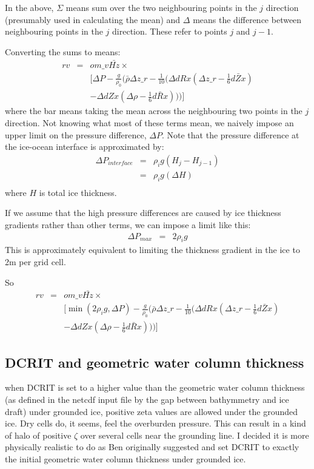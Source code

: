 \documentclass[12pt]{article}
\begin{document}
In the above, $\Sigma$ means sum over the two neighbouring points in the $j$ direction (presumably used in calculating the mean) 
and $\Delta$ means the difference between neighbouring points in the $j$ direction.  These refer to points $j$ and $j-1$.

Converting the sums to means:
\begin{eqnarray}
\nonumber rv & = & {om\_v} \bar{Hz} \times \\
\nonumber && \Big[\Delta P - \frac{g}{\rho_0}  \Big(\bar{\rho} \Delta z\_r - \frac{1}{10} ( \Delta dRx (\Delta z\_r - \frac{1}{6} \bar{dZx}) \\
          && - \Delta dZx (\Delta \rho - \frac{1}{6} \bar{dRx}))\Big)\Big]
\end{eqnarray}
where the bar means taking the mean across the neighbouring two points in the $j$ direction.
Not knowing what most of these terms mean, we naively impose an upper limit on the pressure 
difference, $\Delta P $.  Note that the pressure difference at the ice-ocean interface is approximated by:
\begin{eqnarray}
\Delta P_{interface}  & = & \rho_i g (H_j - H_{j-1}) \\
               & = & \rho_i g (\Delta H)        \\
\end{eqnarray}
where $H$ is total ice thickness.

If we assume that the high pressure differences are caused by ice thickness gradients rather than other terms, 
we can impose a limit like this: 
\begin{eqnarray}
\Delta P_{max} & = & 2 \rho_i g 
\end{eqnarray}
This is approximately equivalent to limiting the thickness gradient in the ice to 2m per grid cell.

So
\begin{eqnarray}
\nonumber rv & = & {om\_v} \bar{Hz} \times \\
\nonumber && \Big[\min(2 \rho_i g,\Delta P) - \frac{g}{\rho_0}  \Big(\bar{\rho} \Delta z\_r - \frac{1}{10} ( \Delta dRx (\Delta z\_r - \frac{1}{6} \bar{dZx}) \\
          && - \Delta dZx (\Delta \rho - \frac{1}{6} \bar{dRx}))\Big)\Big]
\end{eqnarray}


\subsection{DCRIT and geometric water column thickness}
when DCRIT is set to a higher value than the geometric water column thickness (as defined in the netcdf input file 
by the gap between bathymmetry and ice draft) under grounded ice, positive zeta values are allowed under the grounded 
ice.  Dry cells do, it seems, feel the overburden pressure.  This can result in a kind of halo of positive $\zeta$ 
over several cells near the grounding line.  I decided it is more physically realistic to do as Ben originally 
suggested and set DCRIT to exactly the initial geometric water column thickness under grounded ice.
\end{document}
